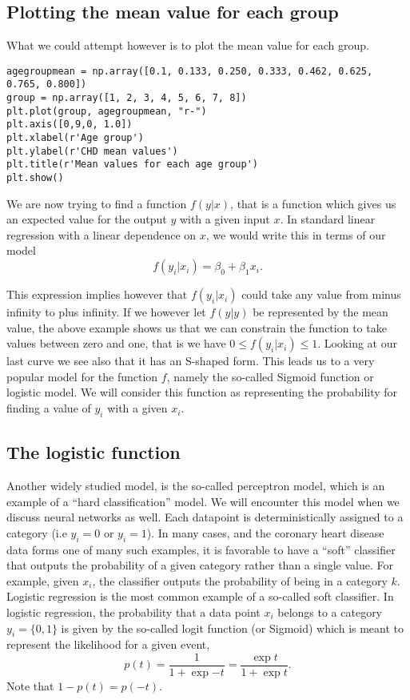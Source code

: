 \documentclass[%
oneside,                 %
final,                   %
10pt]{article}
\begin{document}
\subsection*{Plotting the mean value for each group}

What we could attempt however is to plot the mean value for each group.

\begin{verbatim}
agegroupmean = np.array([0.1, 0.133, 0.250, 0.333, 0.462, 0.625, 0.765, 0.800])
group = np.array([1, 2, 3, 4, 5, 6, 7, 8])
plt.plot(group, agegroupmean, "r-")
plt.axis([0,9,0, 1.0])
plt.xlabel(r'Age group')
plt.ylabel(r'CHD mean values')
plt.title(r'Mean values for each age group')
plt.show()
\end{verbatim}

We are now trying to find a function $f(y\vert x)$, that is a function which gives us an expected value for the output $y$ with a given input $x$.
In standard linear regression with a linear dependence on $x$, we would write this in terms of our model
\[
f(y_i\vert x_i)=\beta_0+\beta_1 x_i.
\]

This expression implies however that $f(y_i\vert x_i)$ could take any
value from minus infinity to plus infinity. If we however let
$f(y\vert y)$ be represented by the mean value, the above example
shows us that we can constrain the function to take values between
zero and one, that is we have $0 \le f(y_i\vert x_i) \le 1$. Looking
at our last curve we see also that it has an S-shaped form. This leads
us to a very popular model for the function $f$, namely the so-called
Sigmoid function or logistic model. We will consider this function as
representing the probability for finding a value of $y_i$ with a given
$x_i$.

\subsection*{The logistic function}

Another widely studied model, is the so-called 
perceptron model, which is an example of a ``hard classification'' model. We
will encounter this model when we discuss neural networks as
well. Each datapoint is deterministically assigned to a category (i.e
$y_i=0$ or $y_i=1$). In many cases, and the coronary heart disease data forms one of many such examples, it is favorable to have a ``soft''
classifier that outputs the probability of a given category rather
than a single value. For example, given $x_i$, the classifier
outputs the probability of being in a category $k$.  Logistic regression
is the most common example of a so-called soft classifier. In logistic
regression, the probability that a data point $x_i$
belongs to a category $y_i=\{0,1\}$ is given by the so-called logit function (or Sigmoid) which is meant to represent the likelihood for a given event, 
\[
p(t) = \frac{1}{1+\mathrm \exp{-t}}=\frac{\exp{t}}{1+\mathrm \exp{t}}.
\]
Note that $1-p(t)= p(-t)$.
\end{document}
